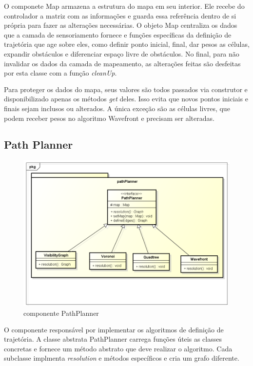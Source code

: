 O componete Map armazena a estrutura do mapa em seu interior. Ele recebe do controlador a matriz com as informações e guarda essa referência dentro de si própria para fazer as alterações necessárias. O objeto Map centraliza os dados que a camada de sensoriamento fornece e funções específicas da definição de trajetória que age sobre eles, como definir ponto inicial, final, dar pesos as células, expandir obstáculos e diferenciar espaço livre de obstáculos. No final, para não invalidar os dados da camada de mapeamento, as alterações feitas são desfeitas por esta classe com a função \textit{cleanUp}.

Para proteger os dados do mapa, seus valores são todos passados via construtor e disponibilizado apenas os métodos \textit{get} deles. Isso evita que novos pontos iniciais e finais sejam inclusos ou alterados. A única exceção são as células livres, que podem receber pesos no algoritmo Wavefront e precisam ser alteradas.

\subsection{Path Planner}

\begin{figure}[h]
	\centering
	\label{fig25}
		\includegraphics[keepaspectratio=true,scale=0.5]{figuras/pkgpathplanner.png}
	\caption{componente PathPlanner}
\end{figure}

O componente responsável por implementar os algoritmos de definição de trajetória. A classe abstrata PathPlanner carrega funções úteis as classes concretas e fornece um método abstrato que deve realizar o algoritmo. Cada subclasse implmenta \textit{resolution} e métodos específicos e cria um grafo diferente.

